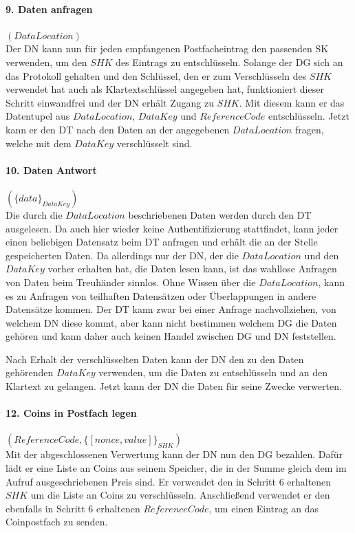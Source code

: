 \documentclass[
	fontsize=11pt,
	headings=small,
	parskip=half,           %
	bibliography=totoc,
	numbers=noenddot,       %
	open=any,               %
]{scrreprt}
\begin{document}
\paragraph{9. Daten anfragen} $(DataLocation)$\\
Der DN kann nun für jeden empfangenen Postfacheintrag den passenden SK verwenden, um den $SHK$ des Eintrags zu entschlüsseln. Solange der DG sich an das Protokoll gehalten und den Schlüssel, den er zum Verschlüsseln des $SHK$ verwendet hat auch als Klartextschlüssel angegeben hat, funktioniert dieser Schritt einwandfrei und der DN erhält Zugang zu $SHK$. Mit diesem kann er das Datentupel aus $DataLocation$, $DataKey$ und $ReferenceCode$ entschlüsseln. Jetzt kann er den DT nach den Daten an der angegebenen $DataLocation$ fragen, welche mit dem $DataKey$ verschlüsselt sind.

\paragraph{10. Daten Antwort} $(\{data\}_{DataKey})$\\
Die durch die $DataLocation$ beschriebenen Daten werden durch den DT ausgelesen. Da auch hier wieder keine Authentifizierung stattfindet, kann jeder einen beliebigen Datensatz beim DT anfragen und erhält die an der Stelle gespeicherten Daten. Da allerdings nur der DN, der die $DataLocation$ und den $DataKey$ vorher erhalten hat, die Daten lesen kann, ist das wahllose Anfragen von Daten beim Treuhänder sinnlos. Ohne Wissen über die $DataLocation$, kann es zu Anfragen von teilhaften Datensätzen oder Überlappungen in andere Datensätze kommen. Der DT kann zwar bei einer Anfrage nachvollziehen, von welchem DN diese kommt, aber kann nicht bestimmen welchem DG die Daten gehören und kann daher auch keinen Handel zwischen DG und DN feststellen.

Nach Erhalt der verschlüsselten Daten kann der DN den zu den Daten gehörenden $DataKey$ verwenden, um die Daten zu entschlüsseln und an den Klartext zu gelangen. Jetzt kann der DN die Daten für seine Zwecke verwerten.

\paragraph{12. Coins in Postfach legen} $(ReferenceCode, \{[nonce,value]\}_{SHK})$\\
\label{para:payment_9}
Mit der abgeschlossenen Verwertung kann der DN nun den DG bezahlen. Dafür lädt er eine Liste an Coins aus seinem Speicher, die in der Summe gleich dem im Aufruf ausgeschriebenen Preis sind. Er verwendet den in Schritt 6 erhaltenen $SHK$ um die Liste an Coins zu verschlüsseln. Anschließend verwendet er den ebenfalls in Schritt 6 erhaltenen $ReferenceCode$, um einen Eintrag an das Coinpostfach zu senden.
\end{document}
